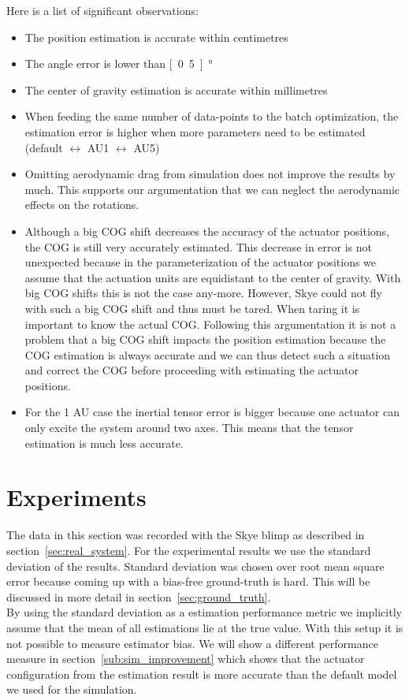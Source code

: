 Here is a list of significant observations:
\begin{itemize}
\item The position estimation is accurate within centimetres
\item The angle error is lower than \unit[0.5]{°}
\item The center of gravity estimation is accurate within millimetres
\item When feeding the same number of data-points to the batch optimization, the estimation error is higher when more parameters need to be estimated (default $\leftrightarrow$ AU1 $\leftrightarrow$ AU5)
\item Omitting aerodynamic drag from simulation does not improve the results by much. This supports our argumentation that we can neglect the aerodynamic effects on the rotations.
\item Although a big COG shift decreases the accuracy of the actuator positions, the COG is still very accurately estimated. This decrease in error is not unexpected because in the parameterization of the actuator positions we assume that the actuation units are equidistant to the center of gravity. With big COG shifts this is not the case any-more. However, Skye could not fly with such a big COG shift and thus must be tared. When taring it is important to know the actual COG. Following this argumentation it is not a problem that a big COG shift impacts the position estimation because the COG estimation is always accurate and we can thus detect such a situation and correct the COG before proceeding with estimating the actuator positions.
\item For the 1 AU case the inertial tensor error is bigger because one actuator can only excite the system around two axes. This means that the tensor estimation is much less accurate.
\end{itemize}


\section{Experiments}
The data in this section was recorded with the Skye blimp as described in section~\ref{sec:real_system}.
For the experimental results we use the standard deviation of the results.
Standard deviation was chosen over root mean square error because coming up with a bias-free ground-truth is hard.
This will be discussed in more detail in section~\ref{sec:ground_truth}. \\
By using the standard deviation as a estimation performance metric we implicitly assume that the mean of all estimations lie at the true value.
With this setup it is not possible to measure estimator bias.
We will show a different performance measure in section~\ref{sub:sim_improvement} which shows that the actuator configuration from the estimation result is more accurate than the default model we used for the simulation.


